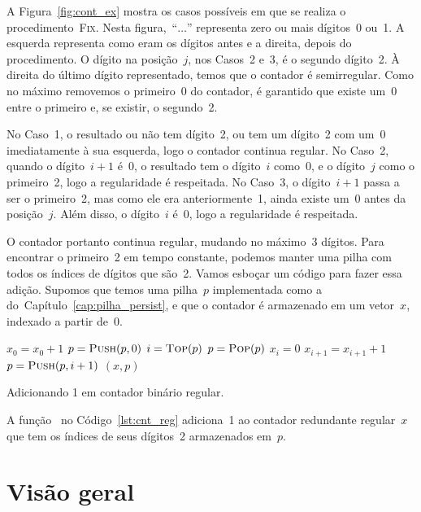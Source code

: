 \documentclass[main.tex]{subfiles}
\begin{document}
A Figura~\ref{fig:cont_ex} mostra os casos possíveis em que se realiza o procedimento~\textsc{Fix}. Nesta figura,~``$\ldots$'' representa zero ou mais dígitos~0 ou~1. A esquerda representa como eram os dígitos antes e a direita, depois do procedimento. O dígito na posição~$j$, nos Casos~2 e~3, é o segundo dígito~2. À direita do último dígito representado, temos que o contador é semirregular. Como no máximo removemos o primeiro~0 do contador, é garantido que existe um~0 entre o primeiro e, se existir, o segundo~2.

No Caso~1, o resultado ou não tem dígito~2, ou tem um dígito~2 com um~0 imediatamente à sua esquerda, logo o contador continua regular. No Caso~2, quando o dígito~$i + 1$ é~0, o resultado tem o dígito~$i$ como~0, e o dígito~$j$ como o primeiro~2, logo a regularidade é respeitada. No Caso~3, o dígito~$i+1$ passa a ser o primeiro~2, mas como ele era anteriormente~1, ainda existe um~0 antes da posição~$j$. Além disso, o dígito~$i$ é~0, logo a regularidade é respeitada.

O contador portanto continua regular, mudando no máximo~3 dígitos. Para encontrar o primeiro~2 em tempo constante, podemos manter uma pilha com todos os índices de dígitos que são~2. Vamos esboçar um código para fazer essa adição. Supomos que temos uma pilha~$p$ implementada como a do~Capítulo~\ref{cap:pilha_persist}, e que o contador é armazenado em um vetor~$x$, indexado a partir de~0.

\begin{algorithm}
\begin{algorithmic}[1]

    \State $x_0 = x_0 + 1$
        \State $p = \Call{Push}{p, 0}$
    \EndIf
     
        \State $i = \Call{Top}{p}$
        \State $p = \Call{Pop}{p}$
        \State $x_i = 0$
        \State $x_{i+1} = x_{i+1} + 1$
            \State $p = \Call{Push}{p, i + 1}$
        \EndIf
    \EndIf
    \State \Return $(x, p)$
\EndFunction

\end{algorithmic}
\caption{Adicionando 1 em contador binário regular. \label{lst:cnt_reg}}
\end{algorithm}

A função~ no Código~\ref{lst:cnt_reg} adiciona~1 ao contador redundante regular~$x$ que tem os índices de seus dígitos~2 armazenados em~$p$.

\section{Visão geral}
\end{document}
